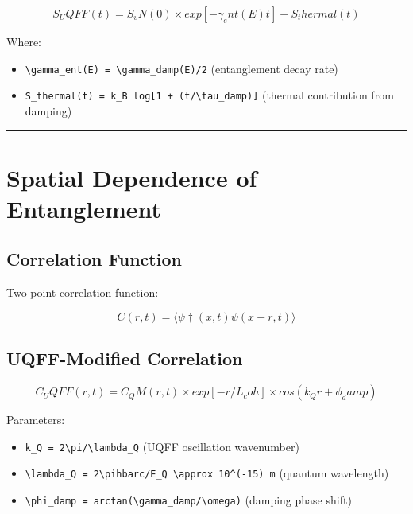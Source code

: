 \documentclass[12pt,a4paper]{article}
\begin{document}
\begin{equation}
S_UQFF(t) = S_vN(0) \times exp[-\gamma_ent(E) t] + S_thermal(t)
\end{equation}

Where:

\begin{itemize}
  \item \texttt{\textbackslash gamma\_ent(E) = \textbackslash gamma\_damp(E)/2} (entanglement decay rate)
  \item \texttt{S\_thermal(t) = k\_B log[1 + (t/\textbackslash tau\_damp)]} (thermal contribution from damping)
\end{itemize}

\medskip\hrule\medskip

\section{Spatial Dependence of Entanglement}

\subsection{Correlation Function}

Two-point correlation function:

\begin{equation}
C(r,t) = ⟨\psi†(x,t) \psi(x+r,t)⟩
\end{equation}

\subsection{UQFF-Modified Correlation}

\begin{equation}
C_UQFF(r,t) = C_QM(r,t) \times exp[-r/L_coh] \times cos(k_Q r + \phi_damp)
\end{equation}

Parameters:

\begin{itemize}
  \item \texttt{k\_Q = 2\textbackslash pi/\textbackslash lambda\_Q} (UQFF oscillation wavenumber)
  \item \texttt{\textbackslash lambda\_Q = 2\textbackslash pihbarc/E\_Q \textbackslash approx 10\^{}(-15) m} (quantum wavelength)
  \item \texttt{\textbackslash phi\_damp = arctan(\textbackslash gamma\_damp/\textbackslash omega)} (damping phase shift)
\end{itemize}
\end{document}
